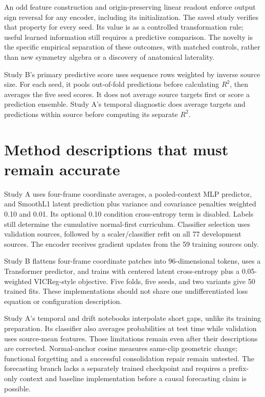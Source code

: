 \documentclass[11pt,letterpaper]{article}
\begin{document}
An odd feature construction and origin-preserving linear readout enforce
output sign reversal for any encoder, including its initialization. The
saved study verifies that property for every seed. Its value is as a
controlled transformation rule; useful learned information still
requires a predictive comparison. The novelty is the specific empirical
separation of these outcomes, with matched controls, rather than new
symmetry algebra or a discovery of anatomical laterality.

Study B's primary predictive score uses sequence rows weighted by
inverse source size. For each seed, it pools out-of-fold predictions
before calculating \(R^2\), then averages the five seed scores. It does
not average source targets first or score a prediction ensemble. Study
A's temporal diagnostic does average targets and predictions within
source before computing its separate \(R^2\).

\section{Method descriptions that must remain
accurate}\label{method-descriptions-that-must-remain-accurate}

Study A uses four-frame coordinate averages, a pooled-context MLP
predictor, and SmoothL1 latent prediction plus variance and covariance
penalties weighted 0.10 and 0.01. Its optional 0.10 condition
cross-entropy term is disabled. Labels still determine the cumulative
normal-first curriculum. Classifier selection uses validation sources,
followed by a scaler/classifier refit on all 77 development sources. The
encoder receives gradient updates from the 59 training sources only.

Study B flattens four-frame coordinate patches into 96-dimensional
tokens, uses a Transformer predictor, and trains with centered latent
cross-entropy plus a 0.05-weighted VICReg-style objective. Five folds,
five seeds, and two variants give 50 trained fits. These implementations
should not share one undifferentiated loss equation or configuration
description.

Study A's temporal and drift notebooks interpolate short gaps, unlike
its training preparation. Its classifier also averages probabilities at
test time while validation uses source-mean features. Those limitations
remain even after their descriptions are corrected. Normal-anchor cosine
measures same-clip geometric change; functional forgetting and a
successful consolidation repair remain untested. The forecasting branch
lacks a separately trained checkpoint and requires a prefix-only context
and baseline implementation before a causal forecasting claim is
possible.
\end{document}
